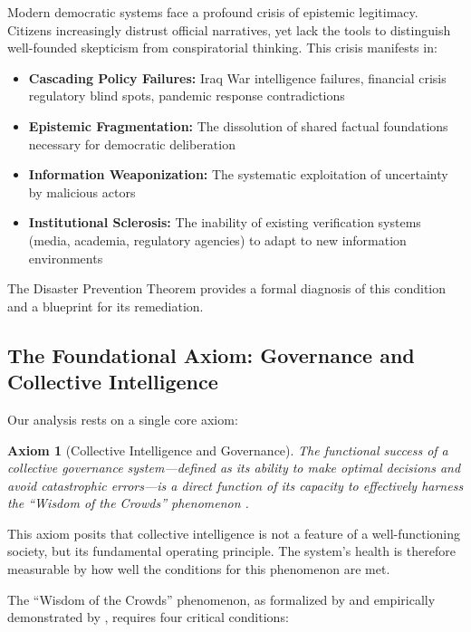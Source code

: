 \documentclass[11pt,a4paper]{article}
\newtheorem{axiom}{Axiom}[section]
\begin{document}
Modern democratic systems face a profound crisis of epistemic legitimacy. Citizens increasingly distrust official narratives, yet lack the tools to distinguish well-founded skepticism from conspiratorial thinking. This crisis manifests in:

\begin{itemize}
    \item \textbf{Cascading Policy Failures:} Iraq War intelligence failures, financial crisis regulatory blind spots, pandemic response contradictions
    \item \textbf{Epistemic Fragmentation:} The dissolution of shared factual foundations necessary for democratic deliberation
    \item \textbf{Information Weaponization:} The systematic exploitation of uncertainty by malicious actors
    \item \textbf{Institutional Sclerosis:} The inability of existing verification systems (media, academia, regulatory agencies) to adapt to new information environments
\end{itemize}

The Disaster Prevention Theorem provides a formal diagnosis of this condition and a blueprint for its remediation.

\subsection{The Foundational Axiom: Governance and Collective Intelligence}

Our analysis rests on a single core axiom:

\begin{axiom}[Collective Intelligence and Governance]
The functional success of a collective governance system---defined as its ability to make optimal decisions and avoid catastrophic errors---is a direct function of its capacity to effectively harness the ``Wisdom of the Crowds'' phenomenon \citep{Surowiecki2004}.
\end{axiom}

This axiom posits that collective intelligence is not a feature of a well-functioning society, but its fundamental operating principle. The system's health is therefore measurable by how well the conditions for this phenomenon are met.

The ``Wisdom of the Crowds'' phenomenon, as formalized by \citet{Surowiecki2004} and empirically demonstrated by \citet{Galton1907}, requires four critical conditions:
\end{document}
